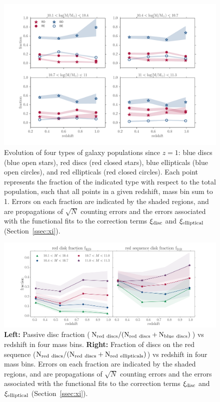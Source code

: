 \documentclass[useAMS,usenatbib]{mn2e}
\begin{document}
\begin{figure}
\centering
\includegraphics[width=\textwidth,trim={0cm 0cm 2cm 1cm},clip]{figures/morphologies_evolved.pdf}
\caption{Evolution of four types of galaxy populations since $z=1$: blue discs (blue open stars), red discs (red closed stars), blue ellipticals (blue open circles), and red ellipticals (red closed circles). Each point represents the fraction of the indicated type with respect to the total population, such that all points in a given redshift, mass bin sum to 1. Errors on each fraction are indicated by the shaded regions, and are propagations of $\sqrt{N}$ counting errors and the errors associated with the functional fits to the correction terms $\xi_{\rm disc}$ and $\xi_{\rm elliptical}$ (Section~\ref{ssec:xi}). }
\label{fig:all_plot}
\end{figure}


\begin{figure}
\centering
\includegraphics[width=\textwidth,trim={0cm 0cm 2cm 1cm},clip]{figures/red_disk_fractions.pdf}
\caption{\textbf{Left:} Passive disc fraction ($\rm N_{red~discs}/(N_{red~discs}+N_{blue~discs})$) vs redshift in four mass bins. \textbf{Right:} Fraction of discs on the red sequence ($\rm N_{red~discs}/(N_{red~discs}+N_{red~ellipticals})$) vs redshift in four mass bins. Errors on each fraction are indicated by the shaded regions, and are propagations of $\sqrt{N}$ counting errors and the errors associated with the functional fits to the correction terms $\xi_{\rm disc}$ and $\xi_{\rm elliptical}$ (Section~\ref{ssec:xi}).} 
\label{fig:f_results}
\end{figure}
\end{document}
